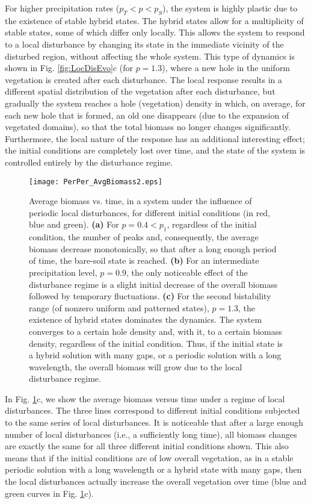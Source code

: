 \documentclass[aps,prl,preprint,superscriptaddress,floatfix]{revtex4-1}
\begin{document}
For higher precipitation rates ($p_T<p<p_S$), the system is highly plastic due to the existence of stable hybrid states.
The hybrid states allow for a multiplicity of stable states, some of which differ only locally.
This allows the system to respond to a local disturbance by changing its state in the immediate vicinity of the disturbed region, without affecting the whole system.
This type of dynamics is shown in Fig. \ref{fig:LocDisEvo}c (for $p=1.3$), where a new hole in the uniform vegetation is created after each disturbance. 
The local response results in a different spatial distribution of the vegetation after each disturbance, 
but gradually the system reaches a hole (vegetation) density in which, on average, for each new hole that is formed, an old one disappears (due to the expansion of vegetated domains), so that the total biomass no longer changes significantly.
Furthermore, the local nature of the response has an additional interesting effect; the initial conditions are completely lost over time, and the state of the system is controlled entirely by the disturbance regime. 

\begin{figure}
  \texttt{[image: PerPer\_AvgBiomass2.eps]}
    \caption{Average biomass vs. time, in a system under the influence of periodic local disturbances, for different initial conditions (in red, blue and green).
 \textbf{(a)} For $p=0.4<p_1$, regardless of the initial condition, the number of peaks and, consequently, the average biomass decrease monotonically, so that after a long enough period of time, the bare-soil state is reached.
 \textbf{(b)} For an intermediate precipitation level, $p=0.9$, the only noticeable effect of the disturbance regime is a slight initial decrease of the overall biomass followed by temporary fluctuations.
 \textbf{(c)} For the second bistability range (of nonzero uniform and patterned states), $p=1.3$, the existence of hybrid states dominates the dynamics.
 The system converges to a certain hole density and, with it, to a certain biomass density, regardless of the initial condition.
 Thus, if the initial state is a hybrid solution with many gaps, or a periodic solution with a long wavelength, the overall biomass will grow due to the local disturbance regime.\label{fig:LocDisBio}}
\end{figure}

In Fig. \ref{fig:LocDisBio}c, we show the average biomass versus time under a regime of local disturbances. 
The three lines correspond to different initial conditions subjected to the same series of local disturbances. 
It is noticeable that after a large enough number of local disturbances (i.e., a sufficiently long time), all biomass changes are exactly the same for all three different initial conditions shown.
This also means that if the initial conditions are of low overall vegetation, as in a stable periodic solution with a long wavelength or a hybrid state with many gaps,
then the local disturbances actually increase the overall vegetation over time (blue and green curves in Fig. \ref{fig:LocDisBio}c).
\end{document}
